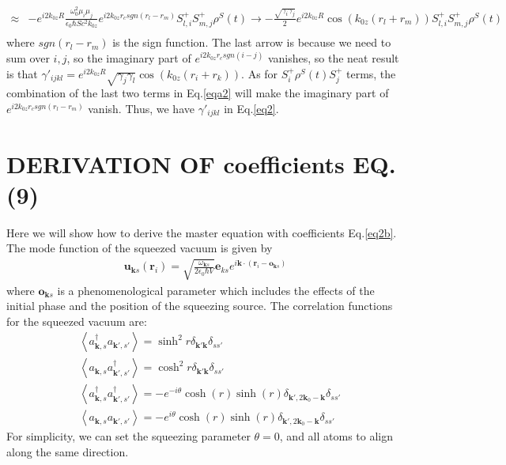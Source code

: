 \documentclass[aps,showpacs,twocolumn,twoside,groupedaddress]{revtex4}
\let\vec\bm
\begin{document}
\begin{widetext}
\begin{equation}
\begin{split}
\approx&-e^{i2k_{0z}R}\frac{\omega_{0}^{2}\mu_{i}\mu_{j}}{\epsilon_{0}\hbar Sc^{2}k_{0z}}e^{i2k_{0z}r_{c}sgn(r_{l}-r_{m})}S_{l,i}^{+}S_{m,j}^{+}\rho^{S}(t)\rightarrow-\frac{\sqrt{\gamma_{i}\gamma_{j}}}{2}e^{i2k_{0z}R}\cos(k_{0z}(r_{l}+r_{m}))S_{l,i}^{+}S_{m,j}^{+}\rho^{S}(t)\\
\end{split}
\end{equation}
where $sgn(r_{l}-r_{m})$ is the sign function. The last arrow is because we need to sum over $i,j$, so the imaginary part of $e^{i2k_{0z}r_{c}sgn(i-j)}$ vanishes, so the neat result is that $\gamma'_{ijkl}=e^{i2k_{0z}R}\sqrt{\gamma_{j}\gamma_{l}}\cos(k_{0z}(r_{i}+r_{k}))$. As for $S_{i}^{+}\rho^{S}(t)S_{j}^{+}$ terms, the combination of the last two terms in Eq.\eqref{eqa2} will make the imaginary part of $e^{i2k_{0z}r_{c}sgn(r_{l}-r_{m})}$ vanish. Thus, we have $\gamma'_{ijkl}$ in Eq.\eqref{eq2}. 

\section{DERIVATION OF coefficients EQ.(9) }
Here we will show how to derive the master equation with coefficients Eq.\eqref{eq2b}. The mode function of the squeezed vacuum is given by
\begin{equation}
  \label{eq2b}
  \begin{gathered}
\vec{u}_{\vec{k}s}(\vec{r}_{i})=\sqrt{\frac{\omega_{\vec{k}s}}{2\epsilon_{0}\hbar V}}\vec{e}_{ks}e^{i\vec{k}\cdot(\vec{r}_{i}-\vec{o}_{\vec{k}s})}
 \end{gathered}
\end{equation}
where $\vec{o}_{\vec{k}s} $ is a phenomenological parameter which includes the effects of the initial phase and the position of the squeezing source\cite{You2018}. The correlation functions for the squeezed vacuum are\cite{scully1999quantum}:
\begin{equation}
\label{eq0a}
\begin{split}
& \left\langle a_{\vec{k},s}^{\dagger}a_{\vec{k}',s'}\right\rangle =\sinh^{2}r\delta_{\vec{k}'\vec{k}}\delta_{ss'} \\
& \left\langle a_{\vec{k},s}a_{\vec{k}',s'}^{\dagger}\right\rangle =\cosh^{2}r\delta_{\vec{k}'\vec{k}}\delta_{ss'}\\
& \left\langle a_{\vec{k},s}^{\dagger}a_{\vec{k}',s'}^{\dagger}\right\rangle =-e^{-i\theta}\cosh(r)\sinh(r)\delta_{\vec{k}',2\vec{k}_{0}-\vec{k}}\delta_{ss'}\\
&\left\langle a_{\vec{k},s}a_{\vec{k}',s'}\right\rangle =-e^{i\theta}\cosh(r)\sinh(r)\delta_{\vec{k}',2\vec{k}_{0}-\vec{k}}\delta_{ss'}
\end{split}
\end{equation}
For simplicity, we can set the squeezing parameter $\theta=0$, and all atoms to align along the same direction.


\end{widetext}
\end{document}
